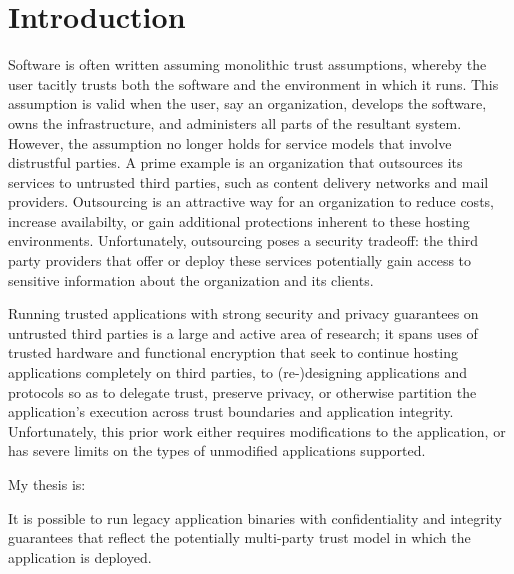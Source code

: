 \section{Introduction}
\label{sec:intro}

Software is often written assuming monolithic trust assumptions, whereby
the user tacitly trusts both the software and the environment in which it runs.
%
This assumption is valid when the user, say an organization, develops the
software, owns the infrastructure, and administers all parts of the resultant
system.
%
However, the assumption no longer holds for service models that involve
distrustful parties.
%
A prime example is an organization that outsources its services to untrusted
third parties, such as content delivery networks and mail providers.
%
Outsourcing is an attractive way for an organization to reduce costs,
increase availabilty, or gain additional protections inherent to these hosting
environments.
%
Unfortunately, outsourcing poses a security tradeoff: the third party
providers that offer or deploy these services potentially gain access to
sensitive information about the organization and its clients.   
%


%

Running trusted applications with strong security and privacy guarantees on
untrusted third parties is a large and active area of research; it spans uses
of trusted hardware and functional encryption that seek to continue hosting
applications completely on third parties, to (re-)designing applications and
protocols so as to delegate trust, preserve privacy, or otherwise partition the
application's execution across trust boundaries and application integrity.
%
Unfortunately, this prior work either requires modifications to the
application, or has severe limits on the types of unmodified applications
supported.


My thesis is:
\begin{displayquote}
    It is possible to run legacy application binaries with confidentiality and
    integrity guarantees that reflect the potentially multi-party trust model
    in which the application is deployed.
\end{displayquote}

